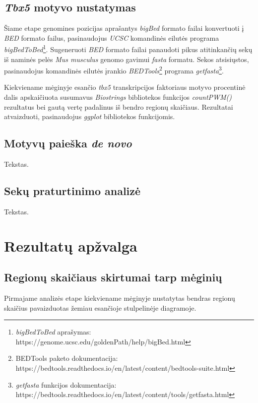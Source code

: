 \documentclass[12pt]{article}
\begin{document}
\subsection{\emph{Tbx5} motyvo nustatymas}
Šiame etape genomines pozicijas aprašantys \emph{bigBed} formato
failai konvertuoti į \emph{BED} formato failus, pasinaudojus
\emph{UCSC} komandinės eilutės programa \emph{bigBedToBed}\footnote[1]
{\emph{bigBedToBed} aprašymas: 
https://genome.ucsc.edu/goldenPath/help/bigBed.html}.
Sugeneruoti \emph{BED} formato failai panaudoti pikus atitinkančių
sekų iš naminės pelės \emph{Mus musculus} genomo gavimui
\emph{fasta} formatu. Sekos atsisiųstos, pasinaudojus komandinės
eilutės įrankio \emph{BEDTools}\footnote[2]{BEDTools paketo
dokumentacija: 
https://bedtools.readthedocs.io/en/latest/content/bedtools-suite.html}
programa \emph{getfasta}\footnote[3]{\emph{getfasta} funkcijos
dokumentacija: 
https://bedtools.readthedocs.io/en/latest/content/tools/getfasta.html}.

Kiekviename mėginyje esančio \emph{tbx5} transkripcijos faktoriaus
motyvo procentinė dalis apskaičiuota susumavus \emph{Biostrings}
bibliotekos funkcijos \emph{countPWM()} rezultatus bei gautą
vertę padalinus iš bendro regionų skaičiaus.
Rezultatai atvaizduoti, pasinaudojus \emph{ggplot} bibliotekos
funkcijomis.

\subsection{Motyvų paieška \emph{de novo}}
Tekstas.

\subsection{Sekų praturtinimo analizė}
Tekstas.

\newpage


\section{Rezultatų apžvalga}
\subsection{Regionų skaičiaus skirtumai tarp mėginių}
Pirmajame analizės etape kiekviename mėginyje nustatytas bendras
regionų skaičius pavaizduotas žemiau esančioje stulpelinėje
diagramoje.
\end{document}
